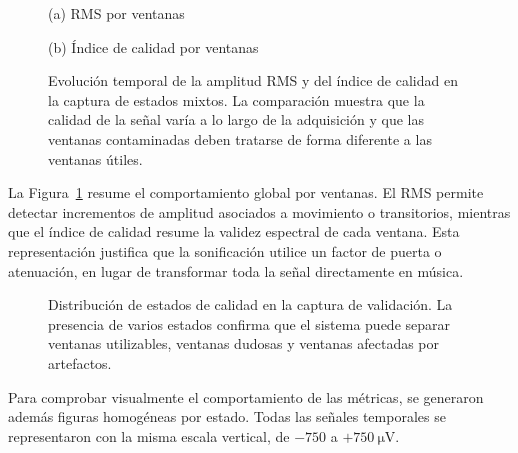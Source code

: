 \documentclass[../main.tex]{subfiles}
\begin{document}
\begin{figure}[htbp]
    \centering
    \begin{minipage}{0.80\textwidth}
        \centering
        \small (a) RMS por ventanas

    \end{minipage}
    \hfill
    \begin{minipage}{0.80\textwidth}
        \centering
        \small (b) Índice de calidad por ventanas

    \end{minipage}
    \caption{Evolución temporal de la amplitud RMS y del índice de calidad en la captura de estados mixtos. La comparación muestra que la calidad de la señal varía a lo largo de la adquisición y que las ventanas contaminadas deben tratarse de forma diferente a las ventanas útiles.}
    \label{fig:validacion_calidad_timeline}
\end{figure}

La Figura~\ref{fig:validacion_calidad_timeline} resume el comportamiento global por ventanas. El RMS permite detectar incrementos de amplitud asociados a movimiento o transitorios, mientras que el índice de calidad resume la validez espectral de cada ventana. Esta representación justifica que la sonificación utilice un factor de puerta o atenuación, en lugar de transformar toda la señal directamente en música.

\begin{figure}[htbp]
    \centering
    \caption{Distribución de estados de calidad en la captura de validación. La presencia de varios estados confirma que el sistema puede separar ventanas utilizables, ventanas dudosas y ventanas afectadas por artefactos.}
    \label{fig:validacion_quality_states}
\end{figure}

Para comprobar visualmente el comportamiento de las métricas, se generaron además figuras homogéneas por estado. Todas las señales temporales se representaron con la misma escala vertical, de \(-750\) a \(+750~\si{\micro\volt}\).
\end{document}
